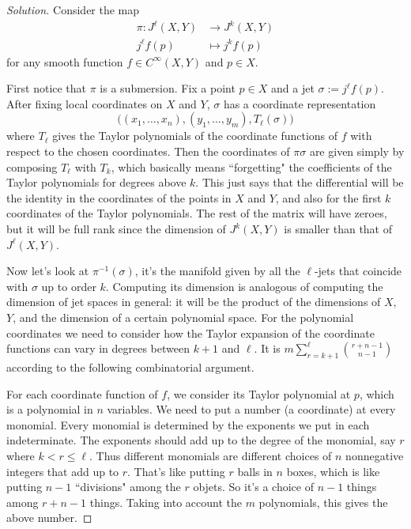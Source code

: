 \begin{proof}[Solution]\leavevmode
Consider the map
\begin{align*}
	\pi: J^\ell(X,Y) &\longrightarrow J^{k}(X,Y) \\
	j^\ell f(p) &\longmapsto j^k f(p)
\end{align*}
for any smooth function \(f \in C^\infty(X,Y)\) and \(p \in X\).

First notice that \(\pi\) is a submersion. Fix a point \(p \in X\) and a jet \(\sigma:= j^\ell f(p)\). After fixing local coordinates on \(X\) and \(Y\), \(\sigma\) has a coordinate representation \[\Big((x_1,\ldots,x_n), (y_1,\ldots,y_m),T_\ell(\sigma)\Big)\] where \(T_\ell\) gives the Taylor polynomials of the coordinate functions of \(f\) with respect to the chosen coordinates. Then the coordinates of \(\pi\sigma\) are given simply by composing \(T_\ell\) with \(T_k\), which basically means ``forgetting" the coefficients of the Taylor polynomials for degrees above \(k\). This just says that the differential will be the identity in the coordinates of the points in \(X\) and \(Y\), and also for the first \(k\) coordinates of the Taylor polynomials. The rest of the matrix will have zeroes, but it will be full rank since the dimension of \(J^k(X,Y)\) is smaller than that of  \(J^\ell(X,Y)\).

Now let's look at \(\pi^{-1}(\sigma)\), it's the manifold given by all the \(\ell\)-jets that coincide with \(\sigma\) up to order \(k\). Computing its dimension is analogous of computing the dimension of jet spaces in general: it will be the product of the dimensions of \(X\), \(Y\), and the dimension of a certain polynomial space. For the polynomial coordinates we need to consider how the Taylor expansion of the coordinate functions can vary in degrees between  \(k+1\) and \(\ell\). It is \(m \sum_{r=k+1}^\ell \binom{r+n-1}{n-1}\) according to the following combinatorial argument.

For each coordinate function of \(f\), we consider its Taylor polynomial at \(p\), which is a polynomial in  \(n\) variables. We need to put a number (a coordinate) at every monomial. Every monomial is determined by the exponents we put in each indeterminate. The exponents should add up to the degree of the monomial, say \(r\) where \(k<r\leq \ell\). Thus different monomials are different choices of \(n\) nonnegative integers that add up to \(r\). That's like putting \(r\) balls in \(n\) boxes, which is like putting \(n-1\) ``divisions" among the \(r\) objets. So it's a choice of \(n-1\) things among \(r+n-1\) things. Taking into account the \(m\) polynomials, this gives the above number.


\end{proof}
